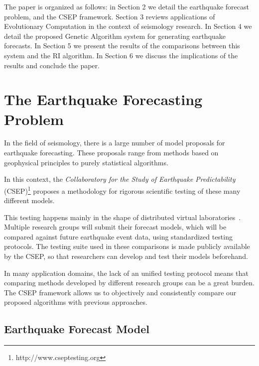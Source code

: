 \documentclass[a4paper,twoside]{article}
\begin{document}
The paper is organized as follows: in Section 2 we detail the
earthquake forecast problem, and the CSEP framework. Section 3 reviews
applications of Evolutionary Computation in the context of seismology
research. In Section 4 we detail the proposed Genetic Algorithm system
for generating earthquake forecasts. In Section 5 we present the
results of the comparisons between this system and the RI
algorithm. In Section 6 we discuss the implications of the results and
conclude the paper.

\section{The Earthquake Forecasting Problem}

In the field of seismology, there is a large number of model proposals
for earthquake forecasting. These proposals range from methods based
on geophysical principles to purely statistical algorithms.

In this context, the \emph{Collaboratory for the Study of Earthquake
  Predictability} (CSEP)\footnote{http://www.cseptesting.org} proposes
a methodology for rigorous scientific testing of these many different
models.

This testing happens mainly in the shape of distributed virtual
laboratories~\cite{Nanjo2011b}. Multiple research groups will submit
their forecast models, which will be compared against future
earthquake event data, using standardized testing protocols. The
testing suite used in these comparisons is made publicly available by
the CSEP, so that researchers can develop and test their models
beforehand.

In many application domains, the lack of an unified testing protocol
means that comparing methods developed by different research groups
can be a great burden. The CSEP framework allows us to objectively and
consistently compare our proposed algorithms with previous approaches.

\subsection{Earthquake Forecast Model}\label{CSEP_definition} 
\end{document}
